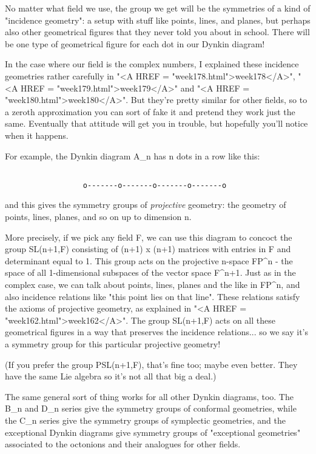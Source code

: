 No matter what field we use, the group we get will be the symmetries 
of a kind of "incidence geometry": a setup with stuff like points, 
lines, and planes, but perhaps also other geometrical figures
that they never told you about in school.  There will be one type
of geometrical figure for each dot in our Dynkin diagram!

In the case where our field is the complex numbers, I explained these
incidence geometries rather carefully in "<A HREF =
"week178.html">week178</A>", "<A HREF =
"week179.html">week179</A>" and "<A HREF =
"week180.html">week180</A>".  But they're pretty similar for other
fields, so to a zeroth approximation you can sort of fake it and pretend
they work just the same.  Eventually that attitude will get you in
trouble, but hopefully you'll notice when it happens.

For example, the Dynkin diagram A_{n} has n dots in a row like this:



\begin{verbatim}

                  o-------o-------o-------o-------o
\end{verbatim}
    
and this gives the symmetry groups of \emph{projective} geometry: the
geometry of points, lines, planes, and so on up to dimension n.

More precisely, if we pick any field F, we can use this diagram to
concoct the group SL(n+1,F) consisting of (n+1) x (n+1) matrices with
entries in F and determinant equal to 1.  This group acts on the
projective n-space FP^{n} - the space of all 1-dimensional
subspaces of the vector space F^{n+1}.  Just as in the complex
case, we can talk about points, lines, planes and the like in
FP^{n}, and also incidence relations like "this point lies
on that line".  These relations satisfy the axioms of projective
geometry, as explained in "<A HREF =
"week162.html">week162</A>".  The group SL(n+1,F) acts on all these
geometrical figures in a way that preserves the incidence
relations... so we say it's a symmetry group for this particular
projective geometry!

(If you prefer the group PSL(n+1,F), that's fine too; maybe even better.
They have the same Lie algebra so it's not all that big a deal.)

The same general sort of thing works for all other Dynkin diagrams, too.
The B_{n} and D_{n} series give the symmetry groups of
conformal geometries, while the C_{n} series give the symmetry
groups of symplectic geometries, and the exceptional Dynkin diagrams
give symmetry groups of "exceptional geometries" associated to
the octonions and their analogues for other fields.

